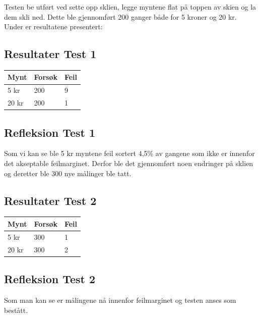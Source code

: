 \documentclass[Modultest/CoinDispenser/CoinDispenserModulTest.tex]{subfiles}
\begin{document}
Testen be utført ved sette opp sklien, legge myntene flat på toppen av skien og la dem skli ned. Dette ble gjennomført 200 ganger både for 5 kroner og 20 kr. Under er resultatene presentert:

\subsection{Resultater Test 1}
\begin{table}[H]
\Large
\centering
\begin{tabular}{|l|l|l|}
\hline

\textbf{Mynt} & \textbf{Forsøk} & \textbf{Feil} \\ \hline
5 kr          & 200             & 9             \\ \hline
20 kr         & 200             & 1             \\ \hline

\end{tabular}
\end{table}

\subsection{Refleksion Test 1}

Som vi kan se ble 5 kr myntene feil sortert 4,5\% av gangene som ikke er innenfor det akseptable feilmarginet. Derfor ble det gjennomført noen endringer på sklien og deretter ble 300 nye målinger ble tatt.

\subsection{Resultater Test 2}
\begin{table}[H]
\Large
\centering
\begin{tabular}{|l|l|l|}
\hline
\textbf{Mynt} & \textbf{Forsøk} & \textbf{Feil} \\ \hline
5 kr          & 300             & 1             \\ \hline
20 kr         & 300             & 2             \\ \hline
\end{tabular}
\end{table}
\subsection{Refleksion Test 2}
Som man kan se er målingene nå innenfor feilmarginet og testen anses som bestått.
\end{document}
